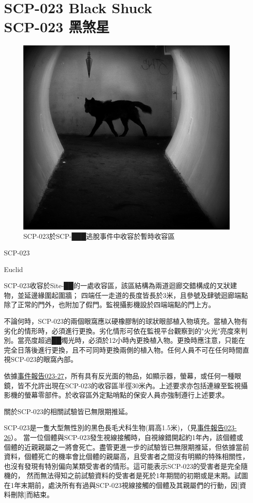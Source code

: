 \chapter[SCP-023 黑煞星]{
    SCP-023 Black Shuck\\
    SCP-023 黑煞星
}

\label{chap:SCP-023}

\begin{figure}[H]
    \centering
    \includegraphics[width=0.5\linewidth]{images/SCP.023.jpg}
    \caption*{SCP-023於SCP-███逃脫事件中收容於暫時收容區}
\end{figure}

SCP-023

Euclid

 SCP-023收容於Site-██的一處收容區，該區結構為兩道迴廊交錯構成的叉狀建物，並延邊緣圍起圍牆； 四端任一走道的長度皆長於3米，且參號及肆號迴廊端點除了正常的門外，也附加了假門。監視攝影機設於四端端點的門上方。

不論何時，SCP-023的兩個眼窩應以硬橡膠制的球狀眼部植入物填充。當植入物有劣化的情形時，必須進行更換。劣化情形可依在監視平台觀察到的"火光"亮度來判別。當亮度超過██燭光時，必須於12小時內更換植入物。更換時應注意，只能在完全日落後進行更換，且不可同時更換兩側的植入物。任何人員不可在任何時間直視SCP-023的眼窩內部。

依據\hyperref[]{事件報告023-27}，所有具有反光面的物品，如顯示器，螢幕，或任何一種眼鏡，皆不允許出現在SCP-023的收容區半徑30米內。上述要求亦包括連線至監視攝影機的螢幕零部件。於收容區外定點哨點的保安人員亦強制遵行上述要求。

關於SCP-023的相關試驗皆已無限期推延。

SCP-023是一隻大型無性別的黑色長毛犬科生物(肩高1.5米)，（見\hyperref[]{事件報告023-26}）。 當一位個體與SCP-023發生視線接觸時，自視線錯開起約1年內，該個體或個體的近親親屬之一將會死亡。盡管更進一步的試驗皆已無限期推延，但依據當前資料，個體死亡的機率會比個體的親屬高，且受害者之間沒有明顯的特殊相關性，也沒有發現有特別偏向某類受害者的情形。這可能表示SCP-023的受害者是完全隨機的， 然而無法得知之前試驗資料的受害者是死於1年期間的初期或是末期。試圖在1年末期前，處決所有有過與SCP-023視線接觸的個體及其親屬們的行動，因[資料刪除]而結束。

